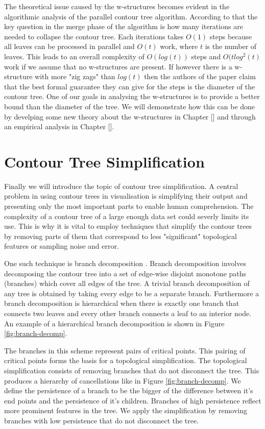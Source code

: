 The theoretical issue caused by the w-structures becomes evident in the algorithmic analysis of the parallel contour tree algorithm. According to that the key question in the merge phase of the algorithm is how many iterations are needed to collapse the contour tree. Each iterations takes $O(1)$ steps because all leaves can be processed in parallel and $O(t)$ work, where $t$ is the number of leaves. This leads to an overall complexity of $O(log(t))$ steps and $O(tlog^2(t)$ work if we assume that no w-structures are present. If however there is a w-structure with more "zig zags" than $log(t)$ then the authors of the paper claim that the best formal guarantee they can give for the steps is the diameter of the contour tree. One of our goals in analysing the w-structures is to provide a better bound than the diameter of the tree. We will demonstrate how this can be done by develping some new theory about the w-structures in Chapter [] and through an empirical analysis in Chapter [].


\section{Contour Tree Simplification}

Finally we will introduce the topic of contour tree simplification. A central problem in using contour trees in visualisation is simplifying their output and presenting only the most important parts to enable human comprehension. The complexity of a contour tree of a large enough data set could severly limits its use. This is why it is vital to employ techniques that simplify the contour trees by removing parts of them that correspond to less "significant" topological features or sampling noise and error.


One such technique is branch decomposition \cite{ct-branch-decomp}. Branch decomposition involves decomposing the contour tree into a set of edge-wise disjoint monotone paths (branches) which cover all edges of the tree. A trivial branch decomposition of any tree is obtained by taking every edge to be a separate branch. Furthermore a branch decomposition is hierarchical when there is exactly one branch that connects two leaves and every other branch connects a leaf to an interior node. An example of a hierarchical branch decomposition is shown in Figure \ref{fig:branch-decomp}.

The branches in this scheme represent pairs of critical points. This pairing of critical points forms the basis for a topological simplification. The topological simplification consists of removing branches that do not disconnect the tree. This produces a hierarchy of cancellations like in Figure \ref{fig:branch-decomp}. We define the persistence of a branch to be the bigger of the difference between it's end points and the persistence of it's children. Branches of high persistence reflect more prominent features in the tree. We apply the simplification by removing branches with low persistence that do not disconnect the tree.

